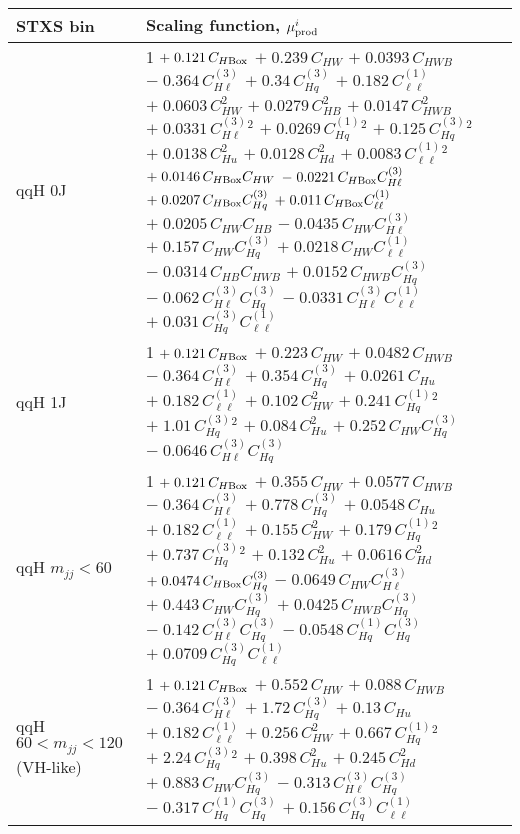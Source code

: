 \begin{tabular}{l|p{}}
    STXS bin & Scaling function, $\mu^i_{\rm{prod}}$ \\ \hline
    qqH 0J & 1 $+\;0.121\,C_{H\rm{Box}}$ $+\;0.239\,C_{HW}$ $+\;0.0393\,C_{HWB}$ $-\;0.364\,C^{(3)}_{H\ell}$ $+\;0.34\,C^{(3)}_{Hq}$ $+\;0.182\,C^{(1)}_{\ell\ell}$ $+\;0.0603\,C_{HW}^{2}$ $+\;0.0279\,C_{HB}^{2}$ $+\;0.0147\,C_{HWB}^{2}$ $+\;0.0331\,C^{(3)}_{H\ell}^{2}$ $+\;0.0269\,C^{(1)}_{Hq}^{2}$ $+\;0.125\,C^{(3)}_{Hq}^{2}$ $+\;0.0138\,C_{Hu}^{2}$ $+\;0.0128\,C_{Hd}^{2}$ $+\;0.0083\,C^{(1)}_{\ell\ell}^{2}$ $+\;0.0146\,C_{H\rm{Box}}C_{HW}$ $-\;0.0221\,C_{H\rm{Box}}C^{(3)}_{H\ell}$ $+\;0.0207\,C_{H\rm{Box}}C^{(3)}_{Hq}$ $+\;0.011\,C_{H\rm{Box}}C^{(1)}_{\ell\ell}$ $+\;0.0205\,C_{HW}C_{HB}$ $-\;0.0435\,C_{HW}C^{(3)}_{H\ell}$ $+\;0.157\,C_{HW}C^{(3)}_{Hq}$ $+\;0.0218\,C_{HW}C^{(1)}_{\ell\ell}$ $-\;0.0314\,C_{HB}C_{HWB}$ $+\;0.0152\,C_{HWB}C^{(3)}_{Hq}$ $-\;0.062\,C^{(3)}_{H\ell}C^{(3)}_{Hq}$ $-\;0.0331\,C^{(3)}_{H\ell}C^{(1)}_{\ell\ell}$ $+\;0.031\,C^{(3)}_{Hq}C^{(1)}_{\ell\ell}$ \\
    qqH 1J & 1 $+\;0.121\,C_{H\rm{Box}}$ $+\;0.223\,C_{HW}$ $+\;0.0482\,C_{HWB}$ $-\;0.364\,C^{(3)}_{H\ell}$ $+\;0.354\,C^{(3)}_{Hq}$ $+\;0.0261\,C_{Hu}$ $+\;0.182\,C^{(1)}_{\ell\ell}$ $+\;0.102\,C_{HW}^{2}$ $+\;0.241\,C^{(1)}_{Hq}^{2}$ $+\;1.01\,C^{(3)}_{Hq}^{2}$ $+\;0.084\,C_{Hu}^{2}$ $+\;0.252\,C_{HW}C^{(3)}_{Hq}$ $-\;0.0646\,C^{(3)}_{H\ell}C^{(3)}_{Hq}$ \\
    qqH $m_{jj} < 60$ & 1 $+\;0.121\,C_{H\rm{Box}}$ $+\;0.355\,C_{HW}$ $+\;0.0577\,C_{HWB}$ $-\;0.364\,C^{(3)}_{H\ell}$ $+\;0.778\,C^{(3)}_{Hq}$ $+\;0.0548\,C_{Hu}$ $+\;0.182\,C^{(1)}_{\ell\ell}$ $+\;0.155\,C_{HW}^{2}$ $+\;0.179\,C^{(1)}_{Hq}^{2}$ $+\;0.737\,C^{(3)}_{Hq}^{2}$ $+\;0.132\,C_{Hu}^{2}$ $+\;0.0616\,C_{Hd}^{2}$ $+\;0.0474\,C_{H\rm{Box}}C^{(3)}_{Hq}$ $-\;0.0649\,C_{HW}C^{(3)}_{H\ell}$ $+\;0.443\,C_{HW}C^{(3)}_{Hq}$ $+\;0.0425\,C_{HWB}C^{(3)}_{Hq}$ $-\;0.142\,C^{(3)}_{H\ell}C^{(3)}_{Hq}$ $-\;0.0548\,C^{(1)}_{Hq}C^{(3)}_{Hq}$ $+\;0.0709\,C^{(3)}_{Hq}C^{(1)}_{\ell\ell}$ \\
    qqH $60 < m_{jj} < 120$ (VH-like) & 1 $+\;0.121\,C_{H\rm{Box}}$ $+\;0.552\,C_{HW}$ $+\;0.088\,C_{HWB}$ $-\;0.364\,C^{(3)}_{H\ell}$ $+\;1.72\,C^{(3)}_{Hq}$ $+\;0.13\,C_{Hu}$ $+\;0.182\,C^{(1)}_{\ell\ell}$ $+\;0.256\,C_{HW}^{2}$ $+\;0.667\,C^{(1)}_{Hq}^{2}$ $+\;2.24\,C^{(3)}_{Hq}^{2}$ $+\;0.398\,C_{Hu}^{2}$ $+\;0.245\,C_{Hd}^{2}$ $+\;0.883\,C_{HW}C^{(3)}_{Hq}$ $-\;0.313\,C^{(3)}_{H\ell}C^{(3)}_{Hq}$ $-\;0.317\,C^{(1)}_{Hq}C^{(3)}_{Hq}$ $+\;0.156\,C^{(3)}_{Hq}C^{(1)}_{\ell\ell}$ \\

\end{tabular}
